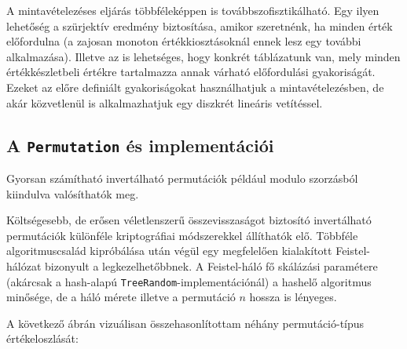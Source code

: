 \documentclass[
    parspace,
    noindent,
    nohyp,
]{elteiktdk}[2023/04/10]
\begin{document}
A mintavételezéses eljárás többféleképpen is továbbszofisztikálható.
Egy ilyen lehetőség a szürjektív eredmény biztosítása, amikor szeretnénk, ha minden érték előfordulna
(a zajosan monoton értékkiosztásoknál ennek lesz egy további alkalmazása).
Illetve az is lehetséges, hogy konkrét táblázatunk van,
mely minden értékkészletbeli értékre tartalmazza annak várható előfordulási gyakoriságát.
Ezeket az előre definiált gyakoriságokat használhatjuk a mintavételezésben,
de akár közvetlenül is alkalmazhatjuk egy diszkrét lineáris vetítéssel.

\subsection{A \texttt{Permutation} és implementációi}

Gyorsan számítható invertálható permutációk például modulo szorzásból kiindulva valósíthatók meg.

Költségesebb, de erősen véletlenszerű összevisszaságot biztosító invertálható permutációk
különféle kriptográfiai módszerekkel állíthatók elő.
Többféle algoritmuscsalád kipróbálása után
végül egy megfelelően kialakított Feistel-hálózat bizonyult a legkezelhetőbbnek.
A Feistel-háló fő skálázási paramétere (akárcsak a hash-alapú \texttt{TreeRandom}-implementációnál)
a hashelő algoritmus minősége,
de a háló mérete illetve a permutáció $n$ hossza is lényeges.

A következő ábrán vizuálisan összehasonlítottam néhány permutáció-típus értékeloszlását:
\end{document}

